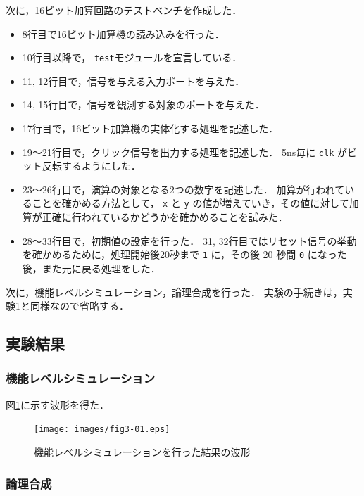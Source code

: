 \documentclass[uplatex]{jsarticle}
\begin{document}
次に，16ビット加算回路のテストベンチを作成した．

\begin{itemize}
  \item 
    8行目で16ビット加算機の読み込みを行った．
  \item 
    10行目以降で， {\tt test}モジュールを宣言している．
  \item 
    11, 12行目で，信号を与える入力ポートを与えた．
  \item 
    14, 15行目で，信号を観測する対象のポートを与えた．
  \item
    17行目で，16ビット加算機の実体化する処理を記述した．
  \item
    19〜21行目で，クリック信号を出力する処理を記述した．
    5ns毎に {\tt clk} がビット反転するようにした．
  \item
    23〜26行目で，演算の対象となる2つの数字を記述した．
    加算が行われていることを確かめる方法として， {\tt x} と {\tt y} の値が増えていき，その値に対して加算が正確に行われているかどうかを確かめることを試みた．
  \item
    28〜33行目で，初期値の設定を行った．
    31, 32行目ではリセット信号の挙動を確かめるために，処理開始後20秒まで {\tt 1} に，その後 20 秒間 {\tt 0} になった後，また元に戻る処理をした．  
\end{itemize}

次に，機能レベルシミュレーション，論理合成を行った．
実験の手続きは，実験1と同様なので省略する．

\subsection{実験結果}

\subsubsection{機能レベルシミュレーション}

図\ref{fig:3-01}に示す波形を得た．

\begin{figure}[htb]
  \begin{center}
    \texttt{[image: images/fig3-01.eps]}
    \caption{機能レベルシミュレーションを行った結果の波形}
    \label{fig:3-01}
  \end{center}
\end{figure}

\subsubsection{論理合成}
\end{document}

